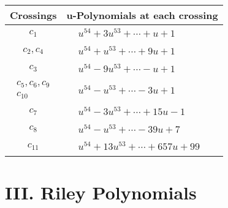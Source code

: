 \documentclass[1p]{elsarticle_modified}
\theoremstyle{definition}
\begin{document}
\begin{tabular}{m{50pt}|m{274pt}}
Crossings & \hspace{64pt}u-Polynomials at each crossing \\
\hline $$\begin{aligned}c_{1}\end{aligned}$$&$\begin{aligned}
&u^{54}+3 u^{53}+\cdots+u+1
\end{aligned}$\\
\hline $$\begin{aligned}c_{2},c_{4}\end{aligned}$$&$\begin{aligned}
&u^{54}+u^{53}+\cdots+9 u+1
\end{aligned}$\\
\hline $$\begin{aligned}c_{3}\end{aligned}$$&$\begin{aligned}
&u^{54}-9 u^{53}+\cdots- u+1
\end{aligned}$\\
\hline $$\begin{aligned}c_{5},c_{6},c_{9}\\c_{10}\end{aligned}$$&$\begin{aligned}
&u^{54}- u^{53}+\cdots-3 u+1
\end{aligned}$\\
\hline $$\begin{aligned}c_{7}\end{aligned}$$&$\begin{aligned}
&u^{54}-3 u^{53}+\cdots+15 u-1
\end{aligned}$\\
\hline $$\begin{aligned}c_{8}\end{aligned}$$&$\begin{aligned}
&u^{54}- u^{53}+\cdots-39 u+7
\end{aligned}$\\
\hline $$\begin{aligned}c_{11}\end{aligned}$$&$\begin{aligned}
&u^{54}+13 u^{53}+\cdots+657 u+99
\end{aligned}$\\
\hline
\end{tabular}\newpage\renewcommand{\arraystretch}{1}
\centering \section*{ III. Riley Polynomials}
\end{document}
